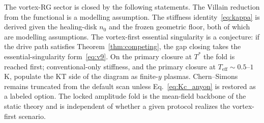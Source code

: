 The vortex-RG sector is closed by the following statements. The Villain reduction from the \TQGL{} functional is a modelling assumption. The stiffness identity~\eqref{eq:kappa} is derived given the healing-disk $n_0$ and the frozen geometric floor, both of which are modelling assumptions. The vortex-first essential singularity is a conjecture: if the drive path satisfies Theorem~\ref{thm:competing}, the gap closing takes the essential-singularity form~\eqref{eq:v9}. On the primary closure at $T^*$ the fold is reached first; conventional-only stiffness, and the primary closure at $T_{\mathrm{eff}}\sim 0.5$--$1$\,K, populate the KT side of the diagram as finite-$y$ plasmas. Chern--Simons remains truncated from the default scan unless Eq.~\eqref{eq:Kc_anyon} is restored as a labeled option. The locked amplitude fold is the mean-field backbone of the static theory and is independent of whether a given protocol realizes the vortex-first scenario.
